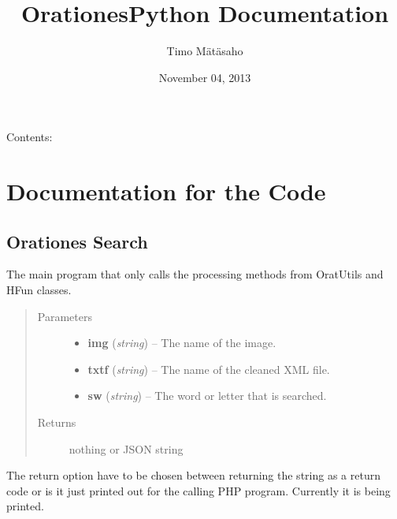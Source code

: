 \documentclass[letterpaper,10pt,english]{sphinxmanual}
\title{OrationesPython Documentation}
\date{November 04, 2013}
\author{Timo Mätäsaho}
\begin{document}
\maketitle
\tableofcontents
{}\label{index::doc}


Contents:


\chapter{Documentation for the Code}
\label{code::doc}\label{code:documentation-for-the-code}\label{code:welcome-to-orationespython-s-documentation}

\section{Orationes Search}
\label{code:module-osearch}\label{code:orationes-search}

\begin{fulllineitems}
\label{code:osearch.osearch}
The main program that only calls the processing methods from OratUtils and HFun classes.
\begin{quote}\begin{description}
\item[{Parameters}] \leavevmode\begin{itemize}
\item {} 
\textbf{img} (\emph{string}) -- The name of the image.

\item {} 
\textbf{txtf} (\emph{string}) -- The name of the cleaned XML file.

\item {} 
\textbf{sw} (\emph{string}) -- The word or letter that is searched.

\end{itemize}

\item[{Returns}] \leavevmode
nothing or JSON string

\end{description}\end{quote}

The return option have to be chosen between returning the string as a return code or 
is it just printed out for the calling PHP program. Currently it is being printed.

\end{fulllineitems}
\end{document}

